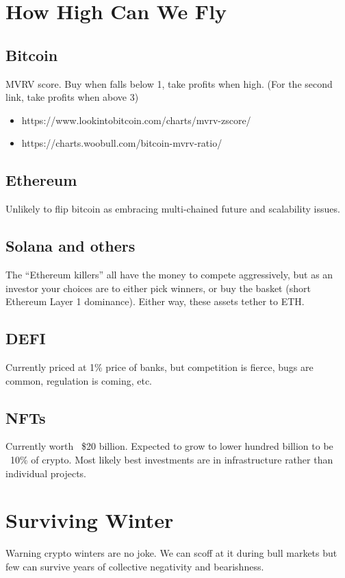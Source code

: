 \documentclass{../notes}
\begin{document}
\section{How High Can We Fly}
\subsection{Bitcoin}
MVRV score. Buy when falls below 1, take profits when high. (For the second link, take profits when above 3)
\begin{itemize}
    \item https://www.lookintobitcoin.com/charts/mvrv-zscore/
    \item https://charts.woobull.com/bitcoin-mvrv-ratio/
\end{itemize}
\subsection{Ethereum}
Unlikely to flip bitcoin as embracing multi-chained future and scalability issues. 

\subsection{Solana and others}
The “Ethereum killers” all have the money to compete aggressively, but as an investor your choices are to either pick winners, or buy the basket (short Ethereum Layer 1 dominance). Either way, these assets tether to ETH.

\subsection{DEFI}
Currently priced at 1\% price of banks, but competition is fierce, bugs are common, regulation is coming, etc. 

\subsection{NFTs}
Currently worth ~\$20 billion. Expected to grow to lower hundred billion to be ~10\% of crypto. Most likely best investments are in infrastructure rather than individual projects. 
\section{Surviving Winter}
Warning crypto winters are no joke. We can scoff at it during bull markets but few can survive years of collective negativity and bearishness. 
\end{document}
